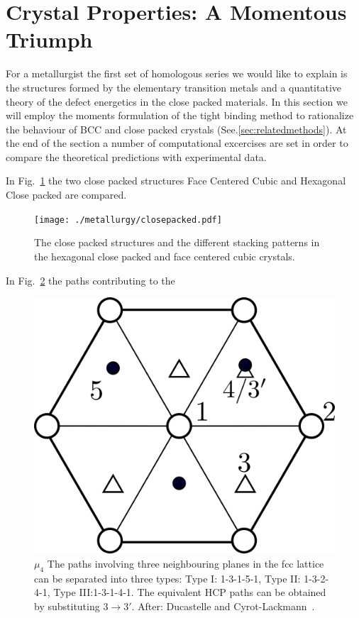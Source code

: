 \section{Crystal Properties: A Momentous Triumph}
For a metallurgist the first set
of homologous series we would like to explain is
the structures formed by the elementary transition metals
and a quantitative theory of the defect energetics in the
close packed materials.
In this section we will employ the moments formulation of 
the tight binding method to rationalize the behaviour of
BCC and close packed crystals (See.\ref{sec:relatedmethods}).
At the end of the section a number of computational excercises
are set in order to compare the theoretical predictions
with experimental data.

In Fig.~\ref{fig:fccvshcp} the two close packed structures 
Face Centered Cubic and Hexagonal Close packed are compared.
\begin{figure}
\texttt{[image: ./metallurgy/closepacked.pdf]}
\caption{The close packed structures and the different stacking patterns
in the hexagonal close packed and face centered cubic crystals.\label{fig:fccvshcp}}
\end{figure}

In Fig.~\ref{fig:fcchcppaths} the paths contributing to the 
\begin{figure}
\includegraphics[scale=1.0]{./metallurgy/fccvshcppaths.png}
\caption{$\mu_{4}$ The paths involving three neighbouring planes 
in the fcc lattice can be separated into three types: 
Type I: 1-3-1-5-1, Type II: 1-3-2-4-1, Type III:1-3-1-4-1.
The equivalent HCP paths can be obtained by substituting 
$3\rightarrow 3'$. After: Ducastelle and 
Cyrot-Lackmann~\cite{ducastelle71}. \label{fig:fcchcppaths}}
\end{figure}

